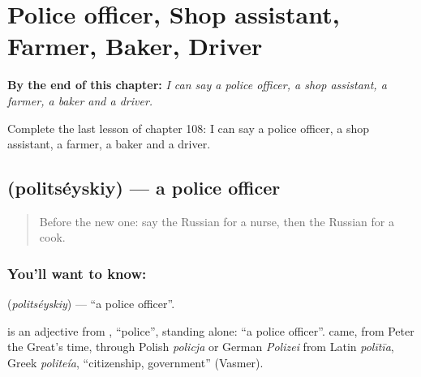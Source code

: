 
\chapter{Police officer, Shop assistant, Farmer, Baker, Driver}
\label{ch:ru-police-officer-shop-assistant-farmer-baker-driver}

\begin{chapteropening}
\textbf{By the end of this chapter:} \emph{I can say a police officer, a shop assistant, a farmer, a baker and a driver.}

Complete the last lesson of chapter 108: I can say a police officer, a shop assistant, a farmer, a baker and a driver.
\end{chapteropening}

\section[\texorpdfstring{\ru{полицейский} (politséyskiy)}{полицейский (politséyskiy)}]{ (politséyskiy) — a police officer}

\label{lesson:RU-C108-police-officer}



\begin{quote}
Before the new one: say the Russian for a nurse, then the Russian for a cook.
\end{quote}

\subsection*{You'll want to know: }
\textbf{} (\emph{politséyskiy}) — \textquotedblleft{}a police officer\textquotedblright{}.

\begin{cousinweb}
\textbf{} is an adjective from \emph{}, \textquotedblleft{}police\textquotedblright{}, standing alone: \textquotedblleft{}a police officer\textquotedblright{}. \emph{} came, from Peter the Great's time, through Polish \emph{policja} or German \emph{Polizei} from Latin \emph{polītīa}, Greek \emph{politeía}, \textquotedblleft{}citizenship, government\textquotedblright{} (Vasmer).
\end{cousinweb}

